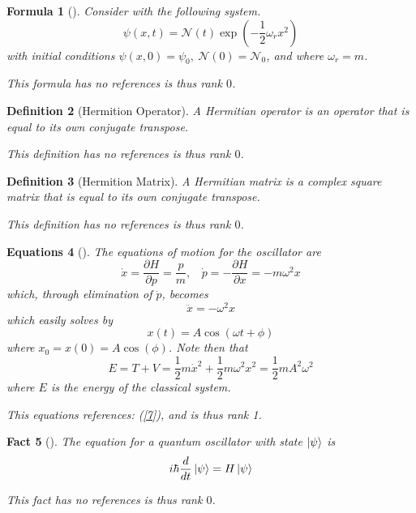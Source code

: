 \documentclass{article}
\newtheorem{definition}{Definition}
\newtheorem{fact}[definition]{Fact}
\newtheorem{formula}[definition]{Formula}
\newtheorem{equations}[definition]{Equations}
\begin{document}
\begin{tcolorbox}[title=Formula]\begin{formula}[]\label{10}Consider with the following system. 
 $$\psi(x,t)=\mathcal{N}(t)\exp\left(-\frac{1}{2}\omega_r x^2\right)$$
 with initial conditions $\psi(x,0)=\psi_0,~\mathcal{N}(0)=\mathcal{N}_0$, 
 and where $\omega_r=m$.
 
 This formula has no references is thus rank $0$.\end{formula}\end{tcolorbox}
\begin{tcolorbox}[title=Definition: Hermition Operator]\begin{definition}[Hermition Operator]\label{11}A Hermitian operator is an operator that is equal 
 to its own conjugate transpose.
 
 This definition has no references is thus rank $0$.\end{definition}\end{tcolorbox}
\begin{tcolorbox}[title=Definition: Hermition Matrix]\begin{definition}[Hermition Matrix]\label{12}A Hermitian matrix is a complex square 
 matrix that is equal to its own conjugate transpose.
 
 This definition has no references is thus rank $0$.\end{definition}\end{tcolorbox}
\begin{tcolorbox}[title=Equations]\begin{equations}[]\label{13}The equations of motion for the oscillator are $$\dot{x}=
 \frac{\partial H}{\partial p}=\frac{p}{m},~~~~\dot{p}=-\frac{\partial H}{\partial x}=
 -m\omega^2 x$$ which, through elimination of $\dot{p}$, becomes
 $$\ddot{x}=-\omega^2x$$ which easily solves by
 $$x(t)=A\cos(\omega t+\phi)$$ where $x_0=x(0)=A\cos(\phi)$. Note then that
 $$E=T+V=\frac{1}{2}m\dot{x}^2+\frac{1}{2}m\omega^2x^2=\frac{1}{2}mA^2\omega^2$$
 where $E$ is the energy of the classical system.
 
 This equations references: (\ref{7}), and is thus rank 1.\end{equations}\end{tcolorbox}
\begin{tcolorbox}[title=Fact]\begin{fact}[]\label{14}The equation for a quantum oscillator with state $\ket{\psi}$ is
 $$i\hbar\frac{d}{dt}\ket{\psi}=H\ket{\psi}$$
 
 This fact has no references is thus rank $0$.\end{fact}\end{tcolorbox}
\end{document}
